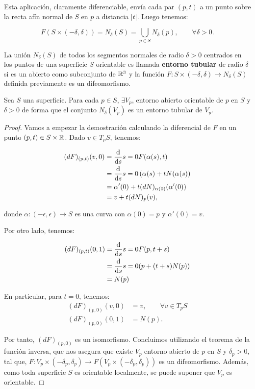 Esta aplicación, claramente diferenciable, envía cada par $(p,t)$ a un punto sobre la recta afín normal de $S$ en $p$ a distancia $|t|$. Luego tenemos:

\begin{equation*}
    F(S \times (-\delta, \delta)) = N_\delta(S)=\bigcup_{p\in S} N_\delta(p), \qquad \forall \delta > 0.
\end{equation*}

\begin{definition}
La unión $N_\delta(S)$ de todos los segmentos normales de radio $\delta > 0$ centrados en los puntos de una superficie $S$ orientable es llamada \textbf{entorno tubular} de radio $\delta$ si es un abierto como subconjunto de $\mathbb{R}^3$ y la función $F: S \times (-\delta, \delta) \longrightarrow N_\delta(S)$ definida previamente es un difeomorfismo.
\end{definition}

\begin{lemma}
Sea $S$ una superficie. Para cada $p \in S$, $\exists V_p$, entorno abierto orientable de $p$ en $S$ y $\delta > 0$ de forma que el conjunto $N_\delta(V_p)$ es un entorno tubular de $V_p$.
\end{lemma}
\begin{proof}
Vamos a empezar la demostración calculando la diferencial de $F$ en un punto $(p,t) \in S \times \mathbb{R}$. Dado $v \in T_pS$, tenemos:

\begin{align*}
    (dF)_{(p,t)}(v,0) &= \diff{}{s}{s=0} F(\alpha(s), t) \\
    &= \diff{}{s}{s=0} \left( \alpha(s) + tN(\alpha(s) \right) \\ 
    &= \alpha'(0) + t(dN)_{\alpha(0)}(\alpha'(0)) \\ 
    &= v + t(dN)_p(v),
\end{align*}

donde $\alpha: (-\epsilon, \epsilon) \longrightarrow S$ es una curva con $\alpha(0) = p$ y $\alpha'(0) = v$. 

Por otro lado, tenemos:

\begin{align*}
    (dF)_{(p,t)}(0,1) &= \diff{}{s}{s=0} F(p, t+s) \\ 
    &= \diff{}{s}{s=0} (p + (t+s)N(p)) \\ &= N(p)
\end{align*}

En particular, para $t=0$, tenemos:
%
\begin{align*}
    (dF)_{(p,0)}(v,0) &= v, \qquad \forall v \in T_pS \\
    (dF)_{(p,0)}(0,1) &= N(p).
\end{align*}

Por tanto, $(dF)_{(p,0)}$ es un isomorfismo. Concluimos utilizando el teorema de la función inversa, que nos asegura que existe $V_p$ entorno abierto de $p$ en $S$ y $\delta_p > 0$, tal que, $F: V_p \times (-\delta_p, \delta_p) \longrightarrow F(V_p \times (-\delta_p, \delta_p))$ es un difeomorfismo. Además, como toda superficie $S$ es orientable localmente, se puede suponer que $V_p$ es orientable.
\end{proof}

